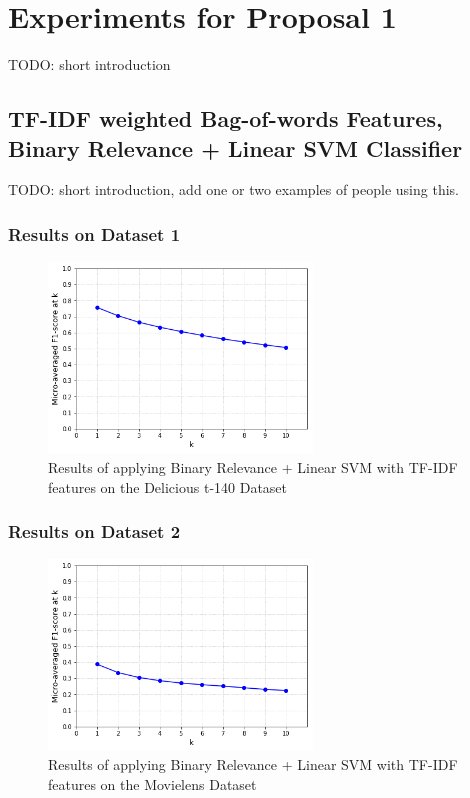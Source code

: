 \section{Experiments for Proposal 1}\label{section:experiment_part_1}

{\color{red} TODO: short introduction}

\subsection{TF-IDF weighted Bag-of-words Features, Binary Relevance + Linear SVM Classifier}

{\color{red} TODO: short introduction, add one or two examples of people using this.}

\subsubsection{Results on Dataset 1}

\begin{figure}[H]
    \centering
    \includegraphics[width=7cm]{chapters/05_experiments/images/svm-tf-idf-delicious-20-frac.png}
    \caption{Results of applying Binary Relevance + Linear SVM with TF-IDF features on the Delicious t-140 Dataset}
    \label{fig:ovr_svm_movielens}
\end{figure}

\subsubsection{Results on Dataset 2}

\begin{figure}[H]
    \centering
    \includegraphics[width=7cm]{chapters/05_experiments/images/svm-tf-idf-movielens.png}
    \caption{Results of applying Binary Relevance + Linear SVM with TF-IDF features on the Movielens Dataset}
    \label{fig:ovr_svm_movielens}
\end{figure}


